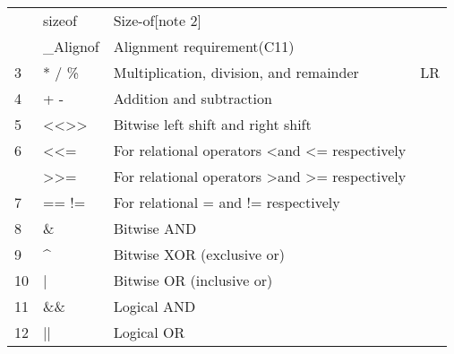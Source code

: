 \documentclass{extarticle}
\begin{document}
\begin{multicols}{4}
\begin{tabular}{|l|l|l|l|}
               & sizeof                                                & Size-of{[}note 2{]}                                                    &               \\
               & \_Alignof                                             & Alignment requirement(C11)                                             &               \\ \hline
3              & * / \%                                                & Multiplication, division, and remainder                                & LR            \\ \hline
4              & + -                                                   & Addition and subtraction                                               &               \\ \hline
5              & \textless{}\textless \textgreater{}\textgreater{}     & Bitwise left shift and right shift                                     &               \\ \hline
6              & \textless \textless{}=                                & For relational operators \textless and \textless{}= respectively       &               \\ \hline
               & \textgreater \textgreater{}=                          & For relational operators \textgreater and \textgreater{}= respectively &               \\ \hline
7              & == !=                                                 & For relational = and != respectively                                   &               \\ \hline
8              & \&                                                    & Bitwise AND                                                            &               \\ \hline
9              & \textasciicircum{}                                    & Bitwise XOR (exclusive or)                                             &               \\ \hline
10             & |                                                     & Bitwise OR (inclusive or)                                              &               \\ \hline
11             & \&\&                                                  & Logical AND                                                            &               \\ \hline
12             & ||                                                    & Logical OR                                                             &               \\ \hline

\end{tabular}
\end{multicols}
\end{document}
